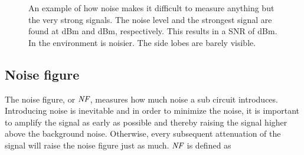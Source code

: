 			\begin{figure}[hb!!!]
				\centering
				\caption[Example of signal plus noise.]{ An example of how noise makes it difficult to measure anything but the very strong signals. The noise level and the strongest signal are found at \unit[20]{dBm} and \unit[87]{dBm}, respectively. This results in a SNR of \unit[67]{dBm}. In  the environment is noisier. The side lobes are barely visible.}\label{fig:noise_example}
			\end{figure}

		\subsection{Noise figure}
			The noise figure, or $\emph{NF}$, measures how much noise a sub circuit introduces. Introducing noise is inevitable and in order to minimize the noise, it is important to amplify the signal as early as possible and thereby raising the signal higher above the background noise. Otherwise, every subsequent attenuation of the signal will raise the noise figure just as much. $\emph{NF}$ is defined as

